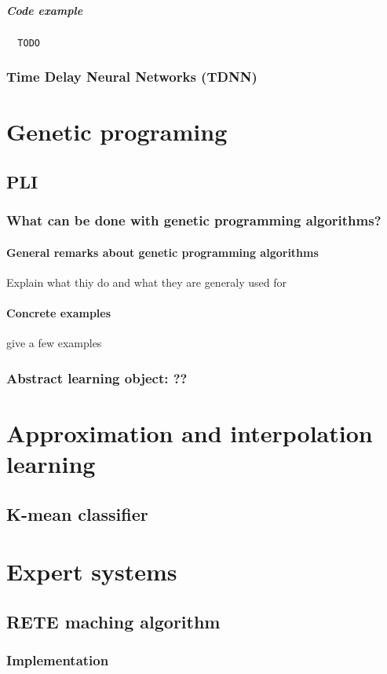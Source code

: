 \paragraph{Code example}
\begin{verbatim}
  TODO
\end{verbatim}

\subsection{Time Delay Neural Networks (TDNN)}

\chapter{Genetic programing}
\label{algorithms:gp}

\section{PLI}

\subsection{What can be done with genetic programming algorithms?}


\subsubsection{General remarks about genetic programming algorithms}
Explain what thiy do and what they are generaly used for

\subsubsection{Concrete examples}
give a few examples

\subsection{Abstract learning object: ??}



\chapter{Approximation and interpolation learning}
\section{K-mean classifier}


\chapter{Expert systems}
\section{RETE maching algorithm}

\subsection{Implementation}

